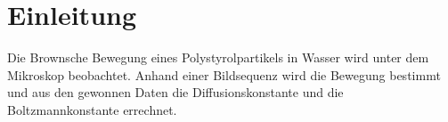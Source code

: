 \section*{Einleitung}
Die Brownsche Bewegung eines Polystyrolpartikels in Wasser wird unter dem Mikroskop beobachtet. Anhand einer Bildsequenz wird die Bewegung bestimmt und aus den gewonnen Daten die Diffusionskonstante und die Boltzmannkonstante errechnet.
